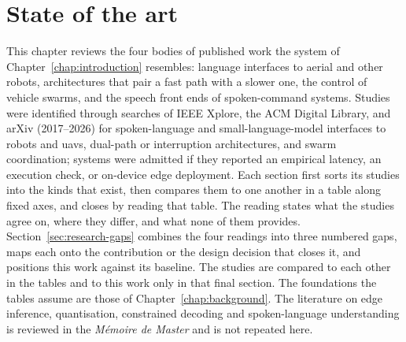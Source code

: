 %

\chapter{State of the art}
\label{chap:state-of-the-art}
This chapter reviews the four bodies of published work the system of
Chapter~\ref{chap:introduction} resembles: language interfaces to aerial and other robots,
architectures that pair a fast path with a slower one, the control of vehicle swarms, and the speech
front ends of spoken-command systems. Studies were identified through searches of IEEE Xplore, the ACM
Digital Library, and arXiv (2017--2026) for spoken-language and small-language-model interfaces to
robots and \glspl{uav}, dual-path or interruption architectures, and swarm coordination; systems were
admitted if they reported an empirical latency, an execution check, or on-device edge deployment.
Each section first sorts its studies into the kinds that
exist, then compares them to one another in a table along fixed axes, and closes by reading that
table. The reading states what the studies agree on, where they differ, and what none of them
provides. Section~\ref{sec:research-gaps} combines the four readings into three numbered gaps, maps
each onto the contribution or the design decision that closes it, and positions this work against
its baseline. The studies are compared to each other in the tables and to this work only in that
final section. The foundations the tables assume are those of Chapter~\ref{chap:background}. The
literature on edge inference, quantisation, constrained decoding and spoken-language understanding
is reviewed in the \emph{M\'emoire de Master} and is not repeated here.

